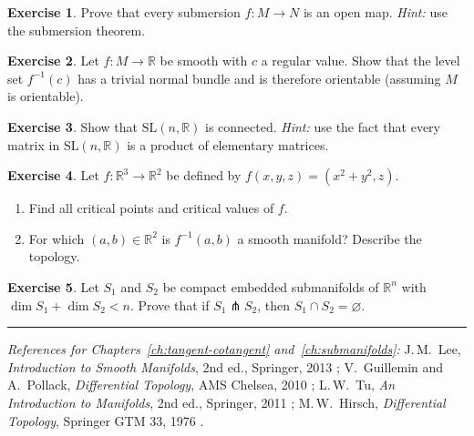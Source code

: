 \documentclass[12pt,a4paper,openany]{book}
\theoremstyle{definition}
\newtheorem{exercise}{Exercise}[chapter]
\theoremstyle{remark}
\newcommand{\R}{\mathbb{R}}
\newcommand{\SL}{\mathrm{SL}}
\begin{document}
\begin{exercise}\label{exo:submersion-open}%
Prove that every submersion $f \colon M \to N$ is an open map.
\textit{Hint:} use the submersion theorem.
\end{exercise}

\begin{exercise}\label{exo:regular-level-set-orientable}
Let $f \colon M \to \R$ be smooth with $c$ a regular value.  Show that
the level set $f^{-1}(c)$ has a trivial normal bundle and is therefore
orientable (assuming $M$ is orientable).
\end{exercise}

\begin{exercise}\label{exo:SLn-connected}%
\index{$\SL(n, \R)$!connected}
Show that $\SL(n, \R)$ is connected.
\textit{Hint:} use the fact that every matrix in $\SL(n, \R)$ is a
product of elementary matrices.
\end{exercise}

\begin{exercise}\label{exo:preimage-submanifold}
Let $f \colon \R^3 \to \R^2$ be defined by $f(x, y, z) = (x^2 + y^2, z)$.
\begin{enumerate}[label=(\alph*)]
  \item Find all critical points and critical values of $f$.
  \item For which $(a, b) \in \R^2$ is $f^{-1}(a, b)$ a smooth manifold?
    Describe the topology.
\end{enumerate}
\end{exercise}

\begin{exercise}\label{exo:transverse-intersection-codim}
Let $S_1$ and $S_2$ be compact embedded submanifolds of $\R^n$ with
$\dim S_1 + \dim S_2 < n$.  Prove that if $S_1 \pitchfork S_2$, then
$S_1 \cap S_2 = \varnothing$.
\end{exercise}

\bigskip
\begin{center}
\rule{0.5\textwidth}{0.4pt}
\end{center}

\noindent\textit{References for Chapters~\ref{ch:tangent-cotangent}
and~\ref{ch:submanifolds}:}
J.\,M.~Lee, \textit{Introduction to Smooth Manifolds}, 2nd ed.,
Springer, 2013 \cite{Lee2013};
V.~Guillemin and A.~Pollack, \textit{Differential Topology}, AMS Chelsea,
2010 \cite{GP2010};
L.\,W.~Tu, \textit{An Introduction to Manifolds}, 2nd ed., Springer,
2011 \cite{Tu2011};
M.\,W.~Hirsch, \textit{Differential Topology}, Springer GTM 33, 1976
\cite{Hirsch1976}.
\end{document}
